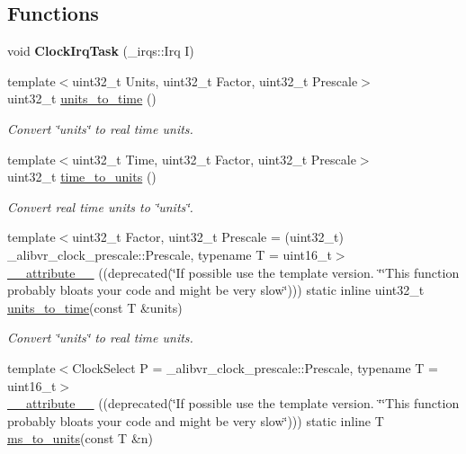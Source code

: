 \subsection*{Functions}
\begin{DoxyCompactItemize}
\item 
void {\bfseries Clock\+Irq\+Task} (\+\_\+irqs\+::\+Irq I)\hypertarget{namespaceclock_aa67adb0b2215c44a4a770b6c36cfe8a7}{}\label{namespaceclock_aa67adb0b2215c44a4a770b6c36cfe8a7}

\item 
{\footnotesize template$<$uint32\+\_\+t Units, uint32\+\_\+t Factor, uint32\+\_\+t Prescale$>$ }\\uint32\+\_\+t \hyperlink{namespaceclock_a59983c7016f94be64afeef3fcf9ecbae}{units\+\_\+to\+\_\+time} ()
\begin{DoxyCompactList}\small\item\em Convert \char`\"{}units\char`\"{} to real time units. \end{DoxyCompactList}\item 
{\footnotesize template$<$uint32\+\_\+t Time, uint32\+\_\+t Factor, uint32\+\_\+t Prescale$>$ }\\uint32\+\_\+t \hyperlink{namespaceclock_a9ce676facac779fb2216999149135442}{time\+\_\+to\+\_\+units} ()
\begin{DoxyCompactList}\small\item\em Convert real time units to \char`\"{}units\char`\"{}. \end{DoxyCompactList}\item 
{\footnotesize template$<$uint32\+\_\+t Factor, uint32\+\_\+t Prescale = (uint32\+\_\+t) \+\_\+alibvr\+\_\+clock\+\_\+prescale\+::\+Prescale, typename T  = uint16\+\_\+t$>$ }\\\hyperlink{namespaceclock_abc1ca865d088a006d44b38313be09f48}{\+\_\+\+\_\+attribute\+\_\+\+\_\+} ((deprecated(\char`\"{}If possible use the template version.  \char`\"{}\char`\"{}This function probably bloats your code and might be very slow\char`\"{}))) static inline uint32\+\_\+t \hyperlink{namespaceclock_a59983c7016f94be64afeef3fcf9ecbae}{units\+\_\+to\+\_\+time}(const T \&units)
\begin{DoxyCompactList}\small\item\em Convert \char`\"{}units\char`\"{} to real time units. \end{DoxyCompactList}\item 
{\footnotesize template$<$Clock\+Select P = \+\_\+alibvr\+\_\+clock\+\_\+prescale\+::\+Prescale, typename T  = uint16\+\_\+t$>$ }\\\hyperlink{namespaceclock_a0c02ffd1be19c752062fa0f8b8785cec}{\+\_\+\+\_\+attribute\+\_\+\+\_\+} ((deprecated(\char`\"{}If possible use the template version.  \char`\"{}\char`\"{}This function probably bloats your code and might be very slow\char`\"{}))) static inline T \hyperlink{namespaceclock_a07c3289d478f0b0d10f336d863757f08}{ms\+\_\+to\+\_\+units}(const T \&n)

\end{DoxyCompactItemize}
